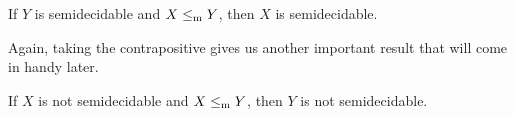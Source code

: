 \begin{theorem}\label{thm:YsemidecidableXsemidecidable}
If $Y$ is semidecidable and $X \leq_{\mathrm{m}} Y$, then $X$ is semidecidable.
\end{theorem}

Again, taking the contrapositive gives us another important result that will come in handy later.

\begin{corollary}\label{cor:XnotsemidecidableYnotsemidecidable}
If $X$ is not semidecidable and $X \leq_{\mathrm{m}} Y$, then $Y$ is not semidecidable.
\end{corollary}